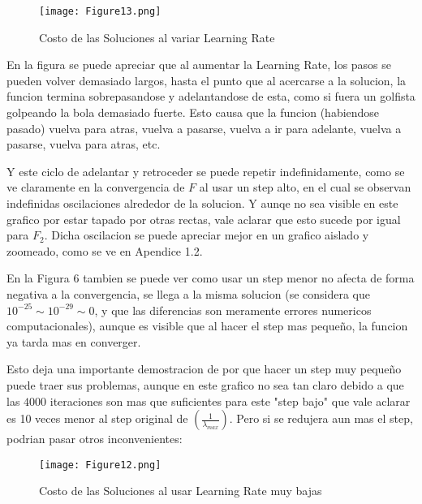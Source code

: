 \documentclass{article}
\begin{document}
\begin{figure}[ht]
    \centering
    \caption{Costo de las Soluciones al variar Learning Rate}
    \texttt{[image: Figure13.png]}
    \label{fig:Image 1}
\end{figure}

\noindent En la figura se puede apreciar que al aumentar la Learning Rate, los pasos se pueden volver demasiado largos, hasta el punto que al acercarse a la solucion, la funcion termina sobrepasandose y adelantandose de esta, como si fuera un golfista golpeando la bola demasiado fuerte. Esto causa que la funcion (habiendose pasado) vuelva para atras, vuelva a pasarse, vuelva a ir para adelante, vuelva a pasarse, vuelva para atras, etc. 
\vspace{\baselineskip}

\noindent Y este ciclo de adelantar y retroceder se puede repetir indefinidamente, como se ve claramente en la convergencia de $F$ al usar un step alto, en el cual se observan indefinidas oscilaciones alrededor de la solucion. Y aunqe no sea visible en este grafico por estar tapado por otras rectas, vale aclarar que esto sucede por igual para $F_2$. Dicha oscilacion se puede apreciar mejor en un grafico aislado y zoomeado, como se ve en Apendice 1.2. 

\vspace{\baselineskip}

\noindent En la Figura 6 tambien se puede ver como usar un step menor no afecta de forma negativa a la convergencia, se llega a la misma solucion (se considera que $10^{-25} \sim 10^{-29} \sim 0$, y que las diferencias son meramente errores numericos computacionales), aunque es visible que al hacer el step mas pequeño, la funcion ya tarda mas en converger. 
\vspace{\baselineskip}

\noindent Esto deja una importante demostracion de por que hacer un step muy pequeño puede traer sus problemas, aunque en este grafico no sea tan claro debido a que las $4000$ iteraciones son mas que suficientes para este "step bajo" que vale aclarar es 10 veces menor al step original de $\left(\frac{1}{\lambda_{max}}\right)$. Pero si se redujera aun mas el step, podrian pasar otros inconvenientes:
\vspace{3\baselineskip}

\begin{figure}[ht]
    \centering
    \caption{Costo de las Soluciones al usar Learning Rate muy bajas}
    \texttt{[image: Figure12.png]}
    \label{fig:Image 1}
\end{figure}
\end{document}
